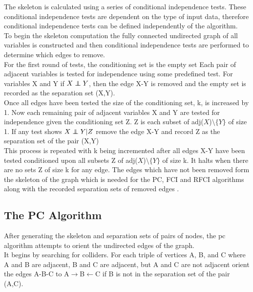 \documentclass{article}
\newcommand\independent{\protect\mathpalette{\protect\independenT}{\perp}}
\def\independenT#1#2{\mathrel{\rlap{$#1#2$}\mkern2mu{#1#2}}}
\begin{document}
The skeleton is calculated using a series of conditional independence tests. These conditional independence tests are dependent on the type of input data, therefore conditional independence tests can be defined independently of the algorithm.
\\

To begin the skeleton computation the fully connected undirected graph of all variables is constructed and then conditional independence tests are performed to determine which edges to remove.
\\

For the first round of tests, the conditioning set is the empty set Each pair of adjacent variables is tested for independence using some predefined test. For variables X and Y if $X \independent Y$, then the edge X-Y is removed and the empty set is recorded as the separation set (X,Y).
\\

Once all edges have been tested the size of the conditioning set, k, is increased by 1. Now each remaining pair of adjacent variables X and Y are tested for independence given the conditioning set Z. Z is each subset of adj($X$)$\setminus \{Y\}$ of size 1. If any test shows $X \independent Y | Z$ remove the edge X-Y and record Z as the separation set of the pair (X,Y) 
\\

This process is repeated with k being incremented after all edges X-Y have been tested conditioned upon all subsets Z of adj($X$)$\setminus \{Y\}$ of size k. It halts when there are no sets Z of size k for any edge. The edges which have not been removed form the skeleton of the graph which is needed for the PC, FCI and RFCI algorithms along with the recorded separation sets of removed edges \cite{colombo2012learning, spirtes1991algorithm}.
\\

\subsection{The PC Algorithm}
After generating the skeleton and separation sets of pairs of nodes, the pc algorithm attempts to orient the undirected edges of the graph.
\\

It begins by searching for colliders. For each triple of vertices A, B, and C where A and B are adjacent, B and C are adjacent, but A and C are not adjacent orient the edges A-B-C to A$\rightarrow$B$\leftarrow$C if B is not in the separation set of the pair (A,C).
\\
\end{document}
